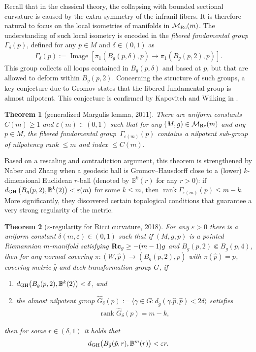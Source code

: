 \documentclass[pdftex]{sigma}
\numberwithin{equation}{section}
\newtheorem{Theorem}{Theorem}[section]
\newcommand{\Rc}{\operatorname{\bf Rc}}
\newcommand{\rank}{\operatorname{rank}}
\begin{document}
Recall that in the classical theory, the collapsing with bounded sectional
curvature is caused by the extra symmetry of the infranil fibers. It is
therefore natural to focus on the local isometries of manifolds in
$\mathcal{M}_{\rm Rc}(m)$. The understanding of such
local isometry is encoded in the \emph{fibered fundamental group}
$\Gamma_{\delta}(p)$, defined for any $p\in M$ and $\delta\in (0,1)$ as
\begin{align*}
\Gamma_{\delta}(p) := \operatorname{Image} [\pi_1(B_g(p,\delta),p)\to \pi_1(B_g(p,2),p) ].
\end{align*}
This group collects all loops contained in
$B_g(p,\delta)$ and based at $p$, but that are allowed to deform within
$B_g(p,2)$. Concerning the structure of such groups, a key conjecture due to
Gromov states that the fibered fundamental group is almost nilpotent. This
conjecture is confirmed by Kapovitch and Wilking in \cite{KW11}.
\begin{Theorem}[generalized Margulis lemma, 2011]\label{thm: KW11}
There are uniform constants $C(m)\ge 1$ and $\varepsilon(m)\in (0,1)$ such that
for any $(M,g)\in \mathcal{M}_{\rm Rc}(m)$ and any $p\in M$, the fibered
fundamental group~$\Gamma_{\varepsilon(m)}(p)$ contains a nilpotent sub-group
of nilpotency rank $\le m$ and index $\le C(m)$.
\end{Theorem}
Based on a rescaling and contradiction argument, this theorem is strengthened by
Naber and Zhang \cite{NaberZhang} when a geodesic ball is Gromov--Hausdorff close
to a (lower) $k$-dimensional Euclidean $r$-ball (denoted by $\mathbb{B}^k(r)$
for any $r>0$): if $d_{\rm GH}\left(B_g(p,2), \mathbb{B}^k(2)\right)
<\varepsilon(m)$ for some $k\le m$, then $\rank \Gamma_{\varepsilon(m)}(p)\le
m-k$. More significantly, they discovered certain topological conditions that
guarantee a very strong regularity of the metric.
\begin{Theorem}[$\varepsilon$-regularity for Ricci curvature, 2018] \label{thm: NZ18}
For any $\varepsilon>0$ there is a uniform constant $\delta(m,\varepsilon)\in
(0,1)$ such that if $(M,g,p)$ is a pointed Riemannian $m$-manifold satisfying
$\Rc_g\ge -(m-1)g$ and $B_g(p,2)\Subset B_g(p,4)$, then for any normal
covering $\pi\colon (W,\hat{p})\to (B_g(p,2),p)$ with $\pi(\hat{p})=p$, covering
metric $\hat{g}$ and deck transformation group $G$, if
\begin{enumerate}\itemsep=0pt
 \item[$1)$] $d_{\rm GH}\big(B_g(p,2),\mathbb{B}^k(2)\big)<\delta$, and
 \item[$2)$] the almost nilpotent group $\widehat{G}_{\delta}(p):= \langle
 \gamma\in G\colon d_{\hat{g}}(\gamma.\hat{p},\hat{p})<2\delta \rangle$
 satisfies \begin{align*}\rank \widehat{G}_{\delta}(p) = m-k,\end{align*}
\end{enumerate}
 then for some $r\in (\delta,1)$ it holds that
\begin{align*}
d_{\rm GH}\big(B_{\hat{g}}(\hat{p},r), \mathbb{B}^m(r)\big) < \varepsilon r.
\end{align*}
 \end{Theorem}
\end{document}
